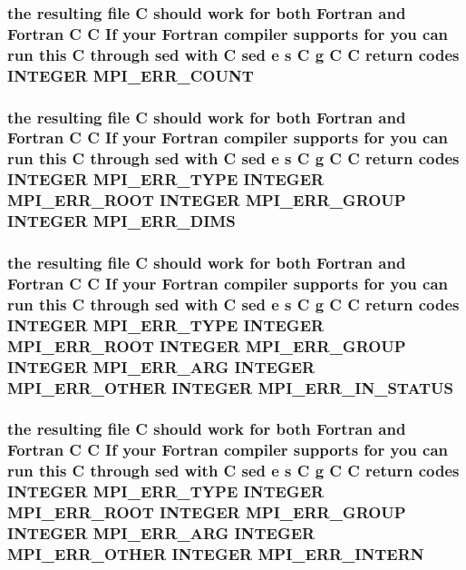 \subsubsection{\setlength{\rightskip}{0pt plus 5cm}the resulting file C should {\bf work} for both Fortran and Fortran C C If your Fortran compiler supports for you can run this C through sed {\bf with} C sed e s C g C C return codes INTEGER {\bf MPI\_\-ERR\_\-COUNT}}\label{mpif_8h_4557f56e9682ef81ef532ab44bc14e7a}


\subsubsection{\setlength{\rightskip}{0pt plus 5cm}the resulting file C should {\bf work} for both Fortran and Fortran C C If your Fortran compiler supports for you can run this C through sed {\bf with} C sed e s C g C C return codes INTEGER MPI\_\-ERR\_\-TYPE INTEGER MPI\_\-ERR\_\-ROOT INTEGER MPI\_\-ERR\_\-GROUP INTEGER {\bf MPI\_\-ERR\_\-DIMS}}\label{mpif_8h_b474188aebb8dfe10cdc4eca2848ad62}


\subsubsection{\setlength{\rightskip}{0pt plus 5cm}the resulting file C should {\bf work} for both Fortran and Fortran C C If your Fortran compiler supports for you can run this C through sed {\bf with} C sed e s C g C C return codes INTEGER MPI\_\-ERR\_\-TYPE INTEGER MPI\_\-ERR\_\-ROOT INTEGER MPI\_\-ERR\_\-GROUP INTEGER MPI\_\-ERR\_\-ARG INTEGER MPI\_\-ERR\_\-OTHER INTEGER {\bf MPI\_\-ERR\_\-IN\_\-STATUS}}\label{mpif_8h_532135b827549fab226332c577d24568}


\subsubsection{\setlength{\rightskip}{0pt plus 5cm}the resulting file C should {\bf work} for both Fortran and Fortran C C If your Fortran compiler supports for you can run this C through sed {\bf with} C sed e s C g C C return codes INTEGER MPI\_\-ERR\_\-TYPE INTEGER MPI\_\-ERR\_\-ROOT INTEGER MPI\_\-ERR\_\-GROUP INTEGER MPI\_\-ERR\_\-ARG INTEGER MPI\_\-ERR\_\-OTHER INTEGER {\bf MPI\_\-ERR\_\-INTERN}}\label{mpif_8h_a8e022edcacc019b7269c2d6fd6f311a}


